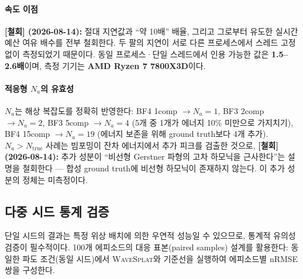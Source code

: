 \documentclass[11pt]{report}
\numberwithin{equation}{chapter}
\numberwithin{figure}{chapter}
\numberwithin{table}{chapter}
\newcommand{\WS}{\textsc{WaveSplat}}
\begin{document}
\paragraph{속도 이점}
\textbf{[철회] (2026-08-14):} 절대 지연값과 ``약 10배'' 배율, 그리고 그로부터 유도한
실시간 예산 여유 배수를 전부 철회한다. 두 팔의 지연이 서로 다른 프로세스에서
스레드 고정 없이 측정되었기 때문이다.
동일 프로세스·단일 스레드에서 인용 가능한 값은 \textbf{1.5--2.6배}이며,
측정 기기는 \textbf{AMD Ryzen 7 7800X3D}이다.

\paragraph{적응형 $N_a$의 유효성}
$N_a$는 해상 복잡도를 정확히 반영한다:
BF4 1comp $\to N_a = 1$, BF3 2comp $\to N_a = 2$,
BF3 5comp $\to N_a = 4$ (5개 중 1개가 에너지 10\% 미만으로 가지치기),
BF4 15comp $\to N_a = 19$ (에너지 보존을 위해 ground truth보다 4개 추가).
$N_a > N_{\text{true}}$ 사례는 빔포밍이 잔차 에너지에서 추가 피크를 검출한 것으로,
\textbf{[철회] (2026-08-14):} 추가 성분이 ``비선형 Gerstner 파형의 고차 하모닉을
근사한다''는 설명을 철회한다 --- 합성 ground truth에 비선형 하모닉이 존재하지 않는다.
이 추가 성분의 정체는 미측정이다.

\subsection{다중 시드 통계 검증}
\label{sec:statistical}

단일 시드의 결과는 특정 위상 배치에 의한 우연적 성능일 수 있으므로,
통계적 유의성 검증이 필수적이다.
100개 에피소드의 대응 표본(paired samples) 설계를 활용한다:
동일한 파도 조건(동일 시드)에서 \WS{}와 기준선을 실행하여
에피소드별 nRMSE 쌍을 구성한다.
\end{document}
